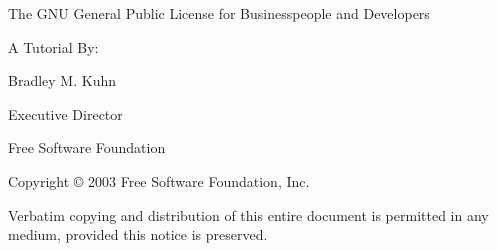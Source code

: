 \documentclass[12pt]{report}
\begin{document}
\begin{titlepage}

{\Large

\begin{center}

\vspace{.5in}

{\sc The GNU General Public License for Businesspeople and Developers } \\

\vspace{1in}

A Tutorial By:

\vspace{.3in}
Bradley M. Kuhn

Executive Director

Free Software Foundation


\end{center}
}

\vfill

{\parindent 0in
Copyright \copyright{} 2003 \hspace{.2in} Free Software Foundation, Inc.

\vspace{.3in}

Verbatim copying and distribution of this entire document is permitted in
any medium, provided this notice is preserved.
}

\end{titlepage}

\pagestyle{plain}
\end{document}
